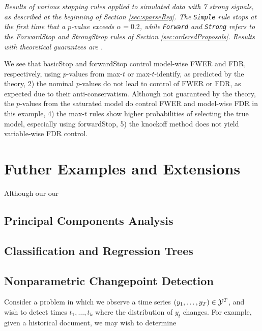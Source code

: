 \documentclass{article}
\begin{document}
\begin{table}[ht]
\centering

\caption[tab:stopping]{\em Results of various stopping rules applied to simulated data with 7 strong signals,  as described at the beginning of Section \ref{sec:sparseReg}.
The {\tt Simple} rule stops at the first time that a $p$-value exceeds $\alpha=0.2$, while {\tt Forward} and {\tt Strong} refers to the ForwardStop and StrongStrop rules of Section \ref{sec:orderedProposals}. Results with theoretical guarantees are .}
\label{tab:stopping20}
\end{table}

We see that basicStop and forwardStop control model-wise FWER and FDR, respectively, using $p$-values from max-$t$ or max-$t$-identify, as predicted by the theory, 2) the nominal $p$-values do not lead to control of FWER or FDR, as expected due to their anti-conservatism. Although not guaranteed by the theory, the $p$-values from the saturated model do control FWER and model-wise FDR in this example, 4) the max-$t$ rules show higher probabilities of selecting the true model, especially using forwardStop, 5) the knockoff method does not yield variable-wise FDR control.


\section{Futher Examples and Extensions}

Although our our 

\subsection{Principal Components Analysis}

\subsection{Classification and Regression Trees}

\subsection{Nonparametric Changepoint Detection}

Consider a problem in which we observe a time series $(y_1,\ldots,y_T)\in \mathcal{Y}^T$, and wish to detect times $t_1,\ldots,t_k$ where the distribution of $y_t$ changes. For example, given a historical document, we may wish to determine 
\end{document}
